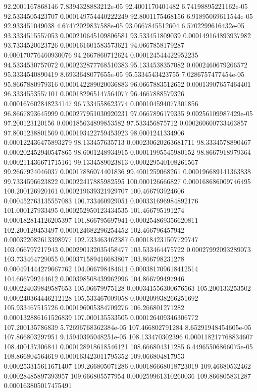 {92.2001167868146 7.8394328883212e-05
92.4001170401482 6.74198895221162e-05
92.5334505423707 0.000149754440222249
92.8001175468156 6.91895069611544e-05
92.933451049038 4.67472029837588e-05
93.0667845512604 6.5702299616432e-05
93.3334515557053 0.000210645109806581
93.533451809039 0.000149164893937982
93.7334520623726 0.000161601583573621
94.0667858179287 0.000170776460930076
94.2667860712624 0.000124544422952235
94.5334530757072 0.000232877768510383
95.1334538357082 0.0002460679266572
95.3334540890419 8.6933648077655e-05
95.5334543423755 7.0286757477454e-05
95.8667880979316 0.000142289020036883
96.0667883512652 0.00013907657464401
96.3334553557101 0.000182965147564077
96.4667888579326 0.000167602848234147
96.7334558623774 0.000104594077301856
96.8667893645999 0.000277951030920231
97.0667896179335 9.00256109987429e-05
97.200123120156 0.000185634899853582
97.533456875712 0.000260600733463857
97.8001238801569 0.000193422759453923
98.0001241334906 0.000122436475893279
98.133457635713 0.000230620263681711
98.3334578890467 0.000202452940547865
98.6001248934915 0.00011995545980152
98.8667918979364 0.000211436671715161
99.1334589023813 0.000229540108261567
99.2667924046037 0.00017886074401836
99.4001259068261 0.000196689141363838
99.7334596623822 0.00022417885982595
100.000126666827 0.000168686009746495
100.200126920161 0.000219639321929707
100.466793924606 0.000452763135557083
100.733460929051 0.000331696984892176
101.000127933495 0.000252950123434535
101.466795191274 0.000182814126205397
101.866795697941 0.000254869356620811
102.200129453497 0.000124682296254452
102.466796457942 0.000322082613398977
102.733463462387 0.000184231507729747
103.066797217943 0.000290132035458477
103.533464475722 0.00027992093289073
103.733464729055 0.000371589416683807
103.866798231278 0.000491444279667762
104.066798484611 0.000381709618412514
104.666799244612 0.000398508439962996
104.866799497946 0.000224039849587653
105.06679975128 0.000341556300676563
105.200133253502 0.000240364446212128
105.533467009058 0.000209938266251692
105.933467515726 0.000196005384709276
106.266801271282 0.000132886161526839
107.000135533505 0.000126409346306772
107.200135786839 5.72696768362384e-05
107.466802791284 8.65291948454605e-05
107.866803297951 9.15940395048251e-05
108.133470302396 0.000118217768834607
108.400137306841 0.000128918618546121
108.666804311285 6.44965506866075e-05
108.866804564619 0.000163423011795352
109.066804817953 0.000253315611671407
109.266805071286 0.000186668018723019
109.46680532462 0.00028485897393957
109.666805577954 0.000259961310260036
109.866805831287 0.000163805017475491
}

